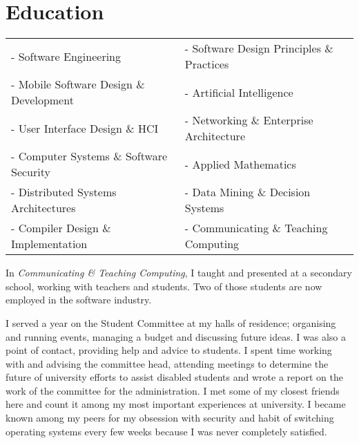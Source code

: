 \documentclass[10pt,a4paper]{moderncv}
\begin{document}
\section{Education}
{
\begin{tabularx}{\textwidth}{ X X }
 - Software Engineering & - Software Design Principles \& Practices \\
 - Mobile Software Design \& Development & - Artificial Intelligence \\
 - User Interface Design \& HCI & - Networking \& Enterprise Architecture \\
 - Computer Systems \& Software Security & - Applied Mathematics \\
 - Distributed Systems Architectures & - Data Mining \& Decision Systems \\
 - Compiler Design \& Implementation & - Communicating \& Teaching Computing \\
\end{tabularx}
\newline{}\newline{}
In \textit{Communicating \& Teaching Computing}, I taught and presented at a secondary school, working with teachers and students. Two of those students are now employed in the software industry.
\newline{}
}

\small{}
\small{}

{I served a year on the Student Committee at my halls of residence; organising and running events, managing a budget and discussing future ideas. I was also a point of contact, providing help and advice to students.}
{I spent time working with and advising the committee head, attending meetings to determine the future of university efforts to assist disabled students and wrote a report on the work of the committee for the administration.}
{I met some of my closest friends here and count it among my most important experiences at university. I became known among my peers for my obsession with security and habit of switching operating systems every few weeks because I was never completely satisfied.
\newline{}
}
\end{document}
